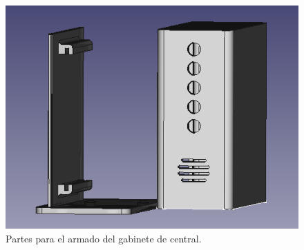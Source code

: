 \begin{figure}[!h]
	\centering
	\includegraphics[scale=.53]{images/central/modelo-3d-central-separado.png}
    \caption{Partes para el armado del gabinete de central.}
	\label{im:impresion-central}
\end{figure}

